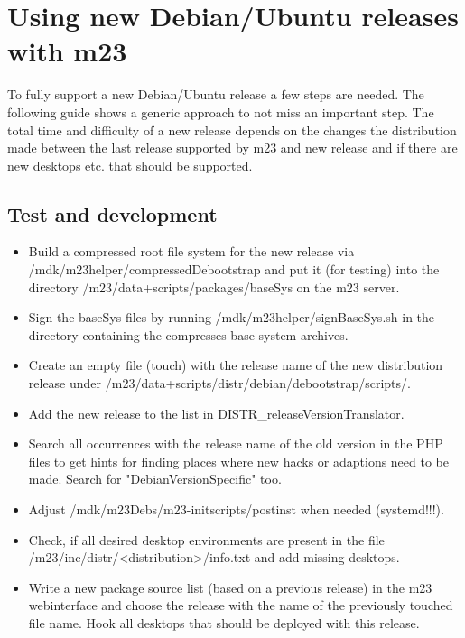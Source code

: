 \section{Using new Debian/Ubuntu releases with m23}
To fully support a new Debian/Ubuntu release a few steps are needed. The following guide shows a generic approach to not miss an important step. The total time and difficulty of a new release depends on the changes the distribution made between the last release supported by m23 and new release and if there are new desktops etc. that should be supported.

\subsection{Test and development}
\begin{itemize}
\item Build a compressed root file system for the new release via /mdk/m23helper/compressedDebootstrap and put it (for testing) into the directory /m23/data+scripts/packages/baseSys on the m23 server.

\item Sign the baseSys files by running /mdk/m23helper/signBaseSys.sh in the directory containing the compresses base system archives.

\item Create an empty file (touch) with the release name of the new distribution release under /m23/data+scripts/distr/debian/debootstrap/scripts/.

\item Add the new release to the list in DISTR_releaseVersionTranslator.

\item Search all occurrences with the release name of the old version in the PHP files to get hints for finding places where new hacks or adaptions need to be made. Search for "DebianVersionSpecific" too.

\item Adjust /mdk/m23Debs/m23-initscripts/postinst when needed (systemd!!!).

\item Check, if all desired desktop environments are present in the file /m23/inc/distr/<distribution>/info.txt and add missing desktops.

\item Write a new package source list (based on a previous release) in the m23 webinterface and choose the release with the name of the previously touched file name. Hook all desktops that should be deployed with this release.


\end{itemize}
